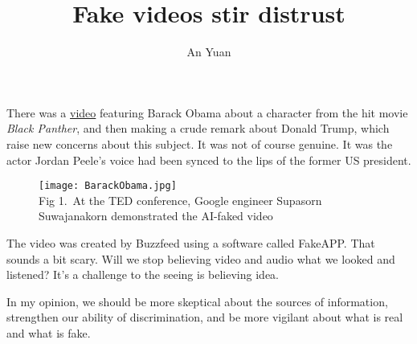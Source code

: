 \documentclass[a4paper, 12pt]{article}
\title{Fake videos stir distrust}
\author{An Yuan}
\begin{document}
\maketitle

There was a \href{https://www.buzzfeed.com/davidmack/obama-fake-news-jordan-peele-psa-video-buzzfeed?utm_term=.onGLbwdPQ#.ml29GBDn8}{video} featuring Barack Obama about a character from the hit movie \emph{Black Panther}, and then making a crude remark about Donald Trump, which raise new concerns about this subject. It was not of course genuine. It was the actor Jordan Peele's voice had been synced to the lips of the former US president.
\begin{figure}[h]
	\centering
	\texttt{[image: BarackObama.jpg]}\\
	Fig 1.~At the TED conference, Google engineer Supasorn Suwajanakorn demonstrated the AI-faked video
\end{figure}
\par
The video was created by Buzzfeed using a software called FakeAPP. That sounds a bit scary. Will we stop believing video and audio what we looked and listened? It's a challenge to the seeing is believing idea.
\par
In my opinion, we should be more skeptical about the sources of information, strengthen our ability of discrimination, and be more vigilant about what is real and what is fake. 
\thispagestyle{empty}
\end{document}
